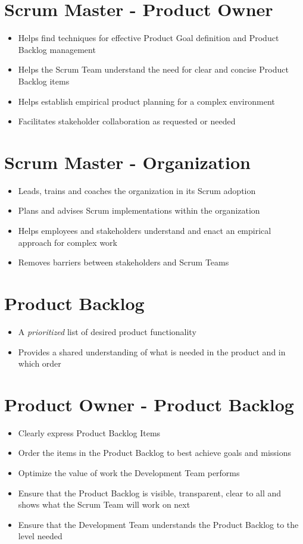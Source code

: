 \documentclass[a4paper,11pt,twocolumn]{article}
\begin{document}
\section*{Scrum Master - Product Owner}
\begin{itemize}
		\item Helps find techniques for effective Product Goal definition and Product Backlog management
		\item Helps the Scrum Team understand the need for clear and concise Product Backlog items
		\item Helps establish empirical product planning for a complex environment
		\item Facilitates stakeholder collaboration as requested or needed
\end{itemize}

\section*{Scrum Master - Organization}
\begin{itemize}
		\item Leads, trains and coaches the organization in its Scrum adoption
		\item Plans and advises Scrum implementations within the organization
		\item Helps employees and stakeholders understand and enact an empirical approach for complex work
		\item Removes barriers between stakeholders and Scrum Teams
\end{itemize}


\section*{Product Backlog}
\begin{itemize}
	\item A \textit{prioritized} list of desired product functionality
	\item Provides a shared understanding of what is needed in the product and in which order
\end{itemize}

\section*{Product Owner - Product Backlog}
\begin{itemize}
    \item Clearly express Product Backlog Items
    \item Order the items in the Product Backlog to best achieve goals and missions
    \item Optimize the value of work the Development Team performs
    \item Ensure that the Product Backlog is visible, transparent, clear to all and shows what the Scrum Team will work on next
    \item Ensure that the Development Team understands the Product Backlog to the level needed
\end{itemize}
\end{document}
